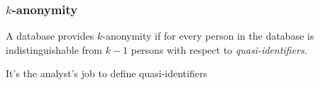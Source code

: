 \begin{frame}
  \frametitle{$k$-anonymity}
  \begin{figure}[H]
    \centering {}
  \end{figure}

  \begin{definition}[$k$-anonymity]
    A database provides $k$-anonymity if for every person in the database is indistinguishable from $k-1$ persons with respect to \emph{quasi-identifiers}.
  \end{definition}
  \alert{It's the analyst's job to define quasi-identifiers}
  
\end{frame}

